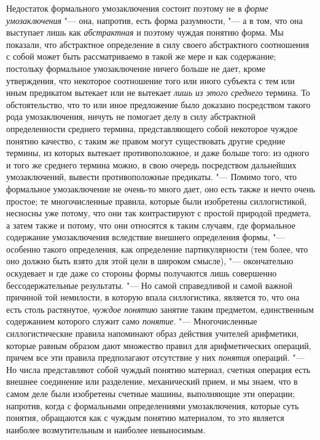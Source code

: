 {{Недостаток формального умозаключения состоит поэтому не в
{\em форме умозаключения}
"--- она, напротив, есть форма разумности, "--- а в
том, что она выступает лишь как
{\em абстрактная} и
поэтому чуждая понятию форма. Мы показали, что абстрактное определение в
силу своего абстрактного соотношения с собой может быть рассматриваемо в
такой же мере и как содержание; постольку формальное умозаключение ничего
больше не дает, кроме утверждения, что некоторое соотношение того или иного
субъекта с тем или иным предикатом вытекает или не вытекает
{\em лишь из этого среднего}
термина. То обстоятельство, что то или иное предложение было
доказано посредством такого рода умозаключения, ничуть не помогает делу в
силу абстрактной определенности среднего термина, представляющего собой
некоторое чуждое понятию качество, с таким же правом могут существовать
другие средние термины, из которых вытекает противоположное, и даже больше
того: из одного и того же среднего термина можно, в свою очередь
посредством дальнейших умозаключений, вывести противоположные предикаты. "---
Помимо того, что формальное умозаключение не очень-то много
дает, оно есть также и нечто очень простое; те многочисленные правила,
которые были изобретены силлогистикой, несносны уже потому, что они так
контрастируют с простой природой предмета, а затем также и потому, что они
относятся к таким случаям, где формальное содержание
умозаключения вследствие внешнего определения формы, "---
особенно такого определения, как определение партикулярности
(тем более, что оно должно быть взято для этой цели в широком смысле), "---
окончательно оскудевает и где даже со стороны формы
получаются лишь совершенно бессодержательные результаты. "---
Но самой справедливой и самой важной причиной той немилости,
в которую впала силлогистика, является то, что она есть столь растянутое,
{\em чуждое понятию}
занятие таким предметом, единственным содержанием которого
служит само {\em понятие}. "---
Многочисленные силлогистические правила напоминают образ
действия учителей арифметики, которые равным образом дают множество правил
для арифметических операций, причем все эти правила предполагают отсутствие
у них {\em понятия}
операций. "--- Но числа представляют собой чуждый
понятию материал, счетная операция есть внешнее соединение или разделение,
механический прием, и мы знаем, что в самом деле были изобретены счетные
машины, выполняющие эти операции; напротив, когда с формальными
определениями умозаключения, которые суть понятия, обращаются как с чуждым
понятию материалом, то это является наиболее возмутительным и наиболее
невыносимым.

}}

